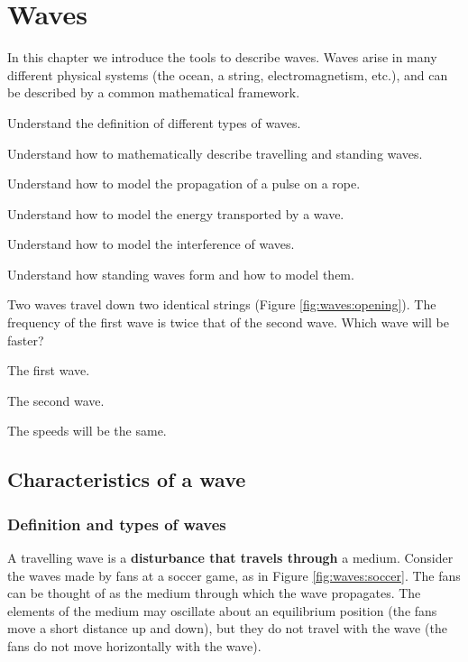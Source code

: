
\chapter{Waves}
\label{chapter:waves}
In this chapter we introduce the tools to describe waves. Waves arise in many different physical systems (the ocean, a string, electromagnetism, etc.), and can be described by a common mathematical framework. 
\begin{learningObjectives}{
 \item Understand the definition of different types of waves.
 \item Understand how to mathematically describe travelling and standing waves.
 \item Understand how to model the propagation of a pulse on a rope.
 \item Understand how to model the energy transported by a wave.
 \item Understand how to model the interference of waves.
 \item Understand how standing waves form and how to model them.
 }
\end{learningObjectives}

\begin{opening}
\begin{MCquestion}{Two waves travel down two identical strings (Figure \ref{fig:waves:opening}). The frequency of the first wave is twice that of the second wave. Which wave will be faster?
}
\item The first wave.
\item The second wave.
\item The speeds will be the same. \correct
\end{MCquestion}
\end{opening}

\section{Characteristics of a wave}
\subsection{Definition and types of waves}
A travelling wave is a \textbf{disturbance that travels through} a medium. Consider the waves made by fans at a soccer game, as in Figure \ref{fig:waves:soccer}. 
The fans can be thought of as the medium through which the wave propagates. The elements of the medium may oscillate about an equilibrium position (the fans move a short distance up and down), but they do not travel with the wave (the fans do not move horizontally with the wave). 

